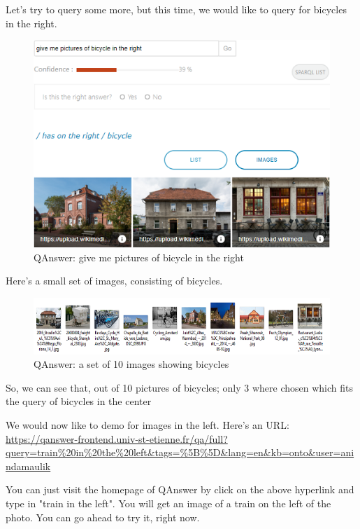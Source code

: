 \documentclass[12pt]{article}
\begin{document}
\newpage
Let's try to query some more, but this time, we would like to query for bicycles in the right.


\begin{figure}[!h]
\center
\includegraphics{right.PNG}
\caption{QAnswer: give me pictures of bicycle  in the right}
\end{figure}
\newpage
Here's a small set of images, consisting of bicycles.

\begin{figure}[!h]
\center
\includegraphics{bicycles.png}
\caption{QAnswer: a set of 10 images showing bicycles}
\end{figure}

So, we can see that, out of 10 pictures of bicycles; only 3 where chosen which fits the query of bicycles in the center

\newline
We would now like to demo for images in the left. Here's an URL: \url{https://qanswer-frontend.univ-st-etienne.fr/qa/full?query=train%20in%20the%20left&tags=%5B%5D&lang=en&kb=onto&user=anindamaulik}

You can just visit the homepage of QAnswer by click on the above hyperlink and type in "train in the left". You will get an image of a train on the left of the photo. You can go ahead to try it, right now.
\end{document}
